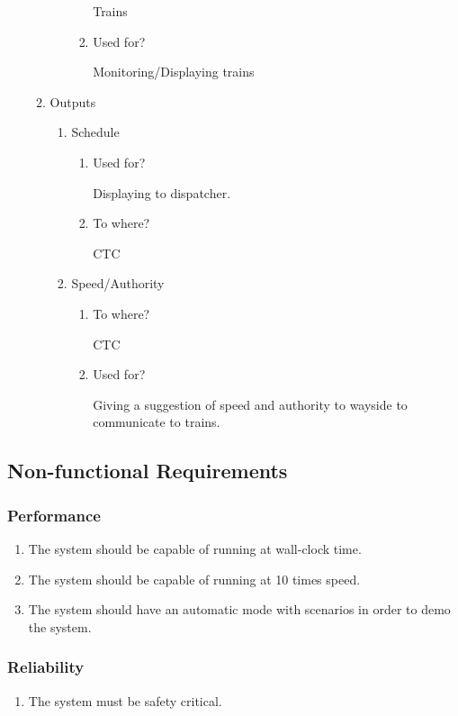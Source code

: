\documentclass[11pt]{article}
\begin{document}
\begin{enumerate}
\begin{enumerate}
\begin{enumerate}
\begin{enumerate}
Trains
\item Used for?
\label{sec-3-1-6-4-1-2-2}

Monitoring/Displaying trains
\end{enumerate}
\end{enumerate}
\item Outputs
\label{sec-3-1-6-4-2}
\begin{enumerate}
\item Schedule
\label{sec-3-1-6-4-2-1}
\begin{enumerate}
\item Used for?
\label{sec-3-1-6-4-2-1-1}

Displaying to dispatcher. 
\item To where?
\label{sec-3-1-6-4-2-1-2}

CTC
\end{enumerate}
\item Speed/Authority
\label{sec-3-1-6-4-2-2}
\begin{enumerate}
\item To where?
\label{sec-3-1-6-4-2-2-1}

CTC
\item Used for?
\label{sec-3-1-6-4-2-2-2}

Giving a suggestion of speed and authority to wayside to communicate to trains.
\end{enumerate}
\end{enumerate}
\end{enumerate}
\end{enumerate}
\subsection{Non-functional Requirements}
\label{sec-3-2}
\subsubsection{Performance}
\label{sec-3-2-1}
\begin{enumerate}
\item The system should be capable of running at wall-clock time.
\item The system should be capable of running at 10 times speed.
\item The system should have an automatic mode with scenarios in order to demo the system.
\end{enumerate}
\subsubsection{Reliability}
\label{sec-3-2-2}
\begin{enumerate}
\item The system must be safety critical.
\end{enumerate}
\end{document}
